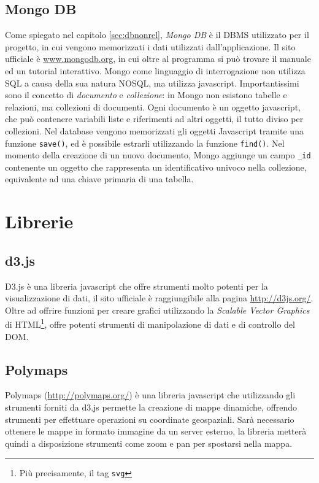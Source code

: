 \subsection{Mongo DB}\label{sec:mongo}
Come spiegato nel capitolo \ref{sec:dbnonrel}, \emph{Mongo DB} è il DBMS utilizzato per il progetto, in cui vengono memorizzati i dati utilizzati dall'applicazione. Il sito ufficiale è \url{www.mongodb.org}, in cui oltre al programma si può trovare il manuale ed un tutorial interattivo. Mongo come linguaggio di interrogazione non utilizza SQL a causa della sua natura NOSQL, ma utilizza javascript. Importantissimi sono il concetto di \emph{documento} e \emph{collezione}: in Mongo non esistono tabelle e relazioni, ma collezioni di documenti. Ogni documento è un oggetto javascript, che può contenere variabili liste e riferimenti ad altri oggetti, il tutto diviso per collezioni. Nel database vengono memorizzati gli oggetti Javascript tramite una funzione \texttt{save()}, ed è possibile estrarli utilizzando la funzione \texttt{find()}. Nel momento della creazione di un nuovo documento, Mongo aggiunge un campo \texttt{\_id} contenente un oggetto che rappresenta un identificativo univoco nella collezione, equivalente ad una chiave primaria di una tabella.

\section{Librerie}
\subsection{d3.js}\label{sec:d3}
D3.js è una libreria javascript che offre strumenti molto potenti per la visualizzazione di dati, il sito ufficiale è raggiungibile alla pagina \url{http://d3js.org/}. Oltre ad offrire funzioni per creare grafici utilizzando la \emph{Scalable Vector Graphics} di HTML\footnote{Più precisamente, il tag \texttt{svg}}, offre potenti strumenti di manipolazione di dati e di controllo del DOM.
		
\subsection{Polymaps}\label{sec:polymaps}
Polymaps (\url{http://polymaps.org/}) è una libreria javascript che utilizzando gli strumenti forniti da d3.js permette la creazione di mappe dinamiche, offrendo strumenti per effettuare operazioni su coordinate geospaziali. Sarà necessario ottenere le mappe in formato immagine da un server esterno, la libreria metterà quindi a disposizione strumenti come zoom e pan per spostarsi nella mappa.






